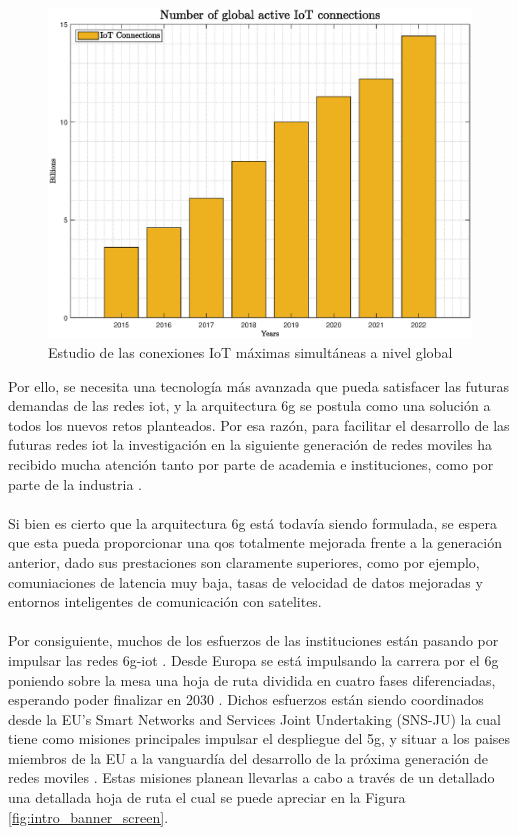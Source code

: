 \begin{figure}[ht]
    \centering
    \includegraphics[width=\textwidth]{archivos/img/intro/fig_iot.eps}
    \caption{Estudio de las conexiones IoT máximas simultáneas a nivel global \cite{figuraIoTDevices}}
    \label{fig:intro_fig_iot}
\end{figure}

Por ello, se necesita una tecnología más avanzada que pueda satisfacer las futuras demandas de las redes \gls{iot}, y la arquitectura \gls{6g} se postula como una solución a todos los nuevos retos planteados. Por esa razón, para facilitar el desarrollo de las futuras redes \gls{iot} la investigación en la siguiente generación de redes moviles ha recibido mucha atención tanto por parte de academia e instituciones, como por parte de la industria \cite{Nguyen2022}. \\
\\
Si bien es cierto que la arquitectura \gls{6g} está todavía siendo formulada, se espera que esta pueda proporcionar una \gls{qos} totalmente mejorada frente a la generación anterior, dado sus prestaciones son claramente superiores, como por ejemplo, comuniaciones de latencia muy baja, tasas de velocidad de datos mejoradas y entornos inteligentes de comunicación con satelites. \\
\\
Por consiguiente, muchos de los esfuerzos de las instituciones están pasando por impulsar las redes \gls{6g}-\gls{iot} \cite{liang2021transfer}. Desde Europa se está impulsando la carrera por el \gls{6g} poniendo sobre la mesa una hoja de ruta dividida en cuatro fases diferenciadas, esperando poder finalizar en 2030 \cite{eu6GFases}. Dichos esfuerzos están siendo coordinados desde la EU’s Smart Networks and Services Joint Undertaking (SNS-JU) la cual tiene como misiones principales impulsar el despliegue del \gls{5g}, y situar a los paises miembros de la EU a la vanguardía del desarrollo de la próxima generación de redes moviles \cite{eu6gSNS}. Estas misiones planean llevarlas a cabo a través de un detallado una detallada hoja de ruta el cual se puede apreciar en la Figura \ref{fig:intro_banner_screen}.

